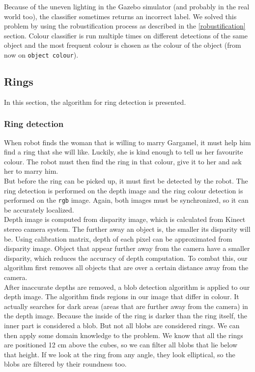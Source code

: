 \documentclass[12pt,a4paper]{article}
\begin{document}
	Because of the uneven lighting in the Gazebo simulator (and probably in the real world too), the classifier sometimes returns an incorrect label. We solved this problem by using the robustification process as described in the \ref{robustification} section. Colour classifier is run multiple times on different detections of the same object and the most frequent colour is chosen as the colour of the object (from now on \texttt{object colour}). \\
	
	\subsection{Rings}
	In this section, the algorithm for ring detection is presented.
	
	\subsubsection{Ring detection} \label{ring_detection}
	When robot finds the woman that is willing to marry Gargamel, it must help him find a ring that she will like. Luckily, she is kind enough to tell us her favourite colour. The robot must then find the ring in that colour, give it to her and ask her to marry him. \\
	
	But before the ring can be picked up, it must first be detected by the robot. The ring detection is performed on the depth image and the ring colour detection is performed on the \texttt{rgb} image. Again, both images must be synchronized, so it can be accurately localized. \\
	
	Depth image is computed from disparity image, which is calculated from Kinect stereo camera system. The further away an object is, the smaller its disparity will be. Using calibration matrix, depth of each pixel can be approximated from disparity image. Object that appear further away from the camera have a smaller disparity, which reduces the accuracy of depth computation. To combat this, our algorithm first removes all objects that are over a certain distance away from the camera. \\
	
	After inaccurate depths are removed, a blob detection algorithm is applied to our depth image. The algorithm finds regions in our image that differ in colour. It actually searches for dark areas (areas that are further away from the camera) in the depth image. Because the inside of the ring is darker than the ring itself, the inner part is considered a blob. But not all blobs are considered rings. We can then apply some domain knowledge to the problem. We know that all the rings are positioned 12 cm above the cubes, so we can filter all blobs that lie below that height. If we look at the ring from any angle, they look elliptical, so the blobs are filtered by their roundness too. \\
	
\end{document}
